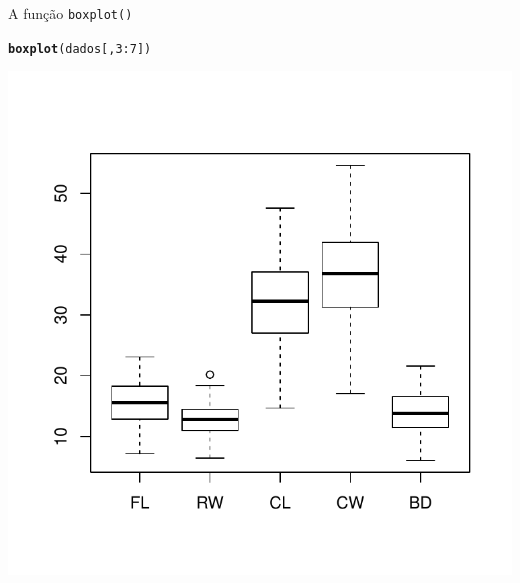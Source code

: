 \documentclass[10pt]{beamer}\usepackage[]{graphicx}\usepackage[]{color}
\makeatletter
\newcommand{\hlnum}[1]{\textcolor[rgb]{0.686,0.059,0.569}{#1}}%
\newcommand{\hlopt}[1]{\textcolor[rgb]{0,0,0}{#1}}%
\newcommand{\hlstd}[1]{\textcolor[rgb]{0.345,0.345,0.345}{#1}}%
\newcommand{\hlkwd}[1]{\textcolor[rgb]{0.282,0.239,0.545}{\textbf{#1}}}%
\newenvironment{kframe}{%
 \def\at@end@of@kframe{}%
 \ifinner\ifhmode%
  \def\at@end@of@kframe{\end{minipage}}%
  \begin{minipage}{\columnwidth}%
 \fi\fi%
 \def\FrameCommand##1{\hskip\@totalleftmargin \hskip-\fboxsep
 \colorbox{shadecolor}{##1}\hskip-\fboxsep
     \hskip-\linewidth \hskip-\@totalleftmargin \hskip\columnwidth}%
 \MakeFramed {\advance\hsize-\width
   \@totalleftmargin\z@ \linewidth\hsize
   \@setminipage}}%
 {\par\unskip\endMakeFramed%
 \at@end@of@kframe}
\newenvironment{knitrout}{}{} %
\makeatother
\begin{document}

\begin{frame}[fragile]{A função \texttt{boxplot()}}
\begin{knitrout}\small
{}\color{fgcolor}\begin{kframe}
\begin{alltt}
\hlkwd{boxplot}\hlstd{(dados[,} \hlnum{3}\hlopt{:}\hlnum{7}\hlstd{])}
\end{alltt}
\end{kframe}

{\centering \includegraphics[width=.7\textwidth]{figure/unnamed-chunk-28} 

}



\end{knitrout}

\end{frame}
\end{document}
